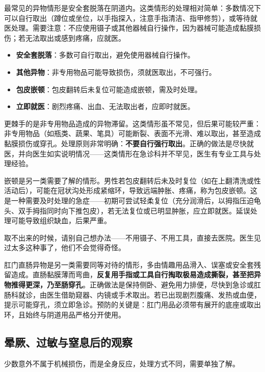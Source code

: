 \documentclass[12pt,UTF8]{ctexbook}
\newcommand{\keyword}[1]{\textbf{#1}}
\begin{document}
最常见的异物情形是安全套脱落在阴道内。这类情形的处理相对简单：多数情况下可以自行取出（蹲位或坐位，以手指探入，注意手指清洁、指甲修剪），或等待就医处理。需要注意：不应使用镊子或其他器械自行操作，因为器械可能造成黏膜损伤；若无法取出或感到疼痛，应就医。

\begin{itemize}
  \item \keyword{安全套脱落}：多数可自行取出，避免使用器械自行操作。
  \item \keyword{其他异物}：非专用物品可能导致损伤，须就医取出，不可强行。
  \item \keyword{包皮嵌顿}：包皮翻转后未复位可能造成嵌顿，需及时处理。
  \item \keyword{立即就医}：剧烈疼痛、出血、无法取出者，应即时就医。
\end{itemize}

更棘手的是非专用物品造成的异物滞留。这类情形虽不常见，但后果可能较严重：非专用物品（如瓶类、蔬果、笔具）可能断裂、表面不光滑、难以取出，甚至造成黏膜损伤或穿孔。处理原则非常明确：\keyword{不要自行强行取出}。正确的做法是尽快就医，并向医生如实说明情况——这类情形在急诊科并不罕见，医生有专业工具与处理经验。

嵌顿是另一类需要了解的情形。男性若包皮翻转后未及时复位（如在上翻清洗或性活动后），可能在冠状沟处形成紧缩环，导致远端肿胀、疼痛，称为包皮嵌顿。这是一种需要及时处理的急症——初期可尝试轻柔复位（充分润滑后，以拇指压迫龟头、双手拇指同时向下推包皮），若无法复位或已明显肿胀，应立即就医。延误处理可能导致组织缺血，后果严重。

\begin{tcolorbox}[colback=pink!5!white,colframe=red!50!black,title=贴心小叮咛]
取不出来的时候，请别自己想办法——不用镊子、不用工具，直接去医院。医生见过太多这种事了，他们不会觉得奇怪。
\end{tcolorbox}

肛门直肠异物是另一类需要同等对待的情形，多由情趣用品滑入、误塞或安全套残留造成。直肠黏膜薄而弯曲，\keyword{反复用手指或工具自行掏取极易造成撕裂，甚至把异物推得更深，乃至肠穿孔}。正确做法是保持侧卧、避免用力排便，尽快到急诊或肛肠科就诊，由医生借助窥器、内镜或手术取出。若已出现剧烈腹痛、发热或血便，提示可能穿孔，须立即急诊。预防的关键是：肛门用品必须带有展开的底座或取出环，且始终与阴道用品严格分开使用。

\subsection{晕厥、过敏与窒息后的观察}

少数意外不属于机械损伤，而是全身反应，处理方式不同，需要单独了解。
\end{document}
